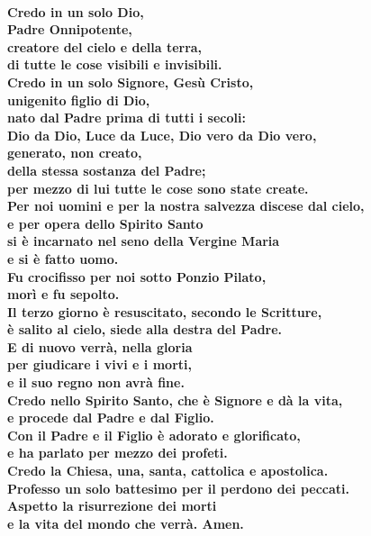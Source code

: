 \\


\vspace{10mm}


\textbf{Credo in un solo Dio, \\
Padre Onnipotente,\\
creatore del cielo e della terra,\\
di tutte le cose visibili e invisibili.\\
Credo in un solo Signore, Ges\`u Cristo,\\
unigenito figlio di Dio,\\
nato dal Padre prima di tutti i secoli:\\
Dio da Dio, Luce da Luce, Dio vero da Dio vero,\\
generato, non creato,\\
della stessa sostanza del Padre;\\
per mezzo di lui tutte le cose sono state create.\\
Per noi uomini e per la nostra salvezza discese dal cielo,\\
e per opera dello Spirito Santo\\
si \`e incarnato nel seno della Vergine Maria\\
e si \`e fatto uomo.\\
Fu crocifisso per noi sotto Ponzio Pilato,\\
mor\`i e fu sepolto.\\
Il terzo giorno \`e resuscitato, secondo le Scritture,\\
\`e salito al cielo, siede alla destra del Padre.\\
E di nuovo verr\`a, nella gloria\\
per giudicare i vivi e i morti,\\
e il suo regno non avr\`a fine.\\
Credo nello Spirito Santo, che \`e Signore e d\`a la vita, \\
e procede dal Padre e dal Figlio.\\
Con il Padre e il Figlio \`e adorato e glorificato,\\
e ha parlato per mezzo dei profeti.\\
Credo la Chiesa, una, santa, cattolica e apostolica.\\
Professo un solo battesimo per il perdono dei peccati.\\
Aspetto la risurrezione dei morti\\
e la vita del mondo che verr\`a. Amen.}

